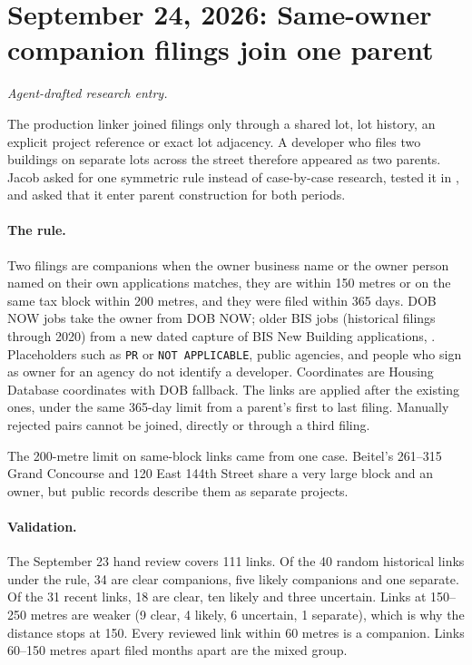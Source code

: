 \clearpage
\section*{September 24, 2026: Same-owner companion filings join one parent}
\textit{Agent-drafted research entry.}

The production linker joined filings only through a shared lot, lot history,
an explicit project reference or exact lot adjacency. A developer who files
two buildings on separate lots across the street therefore appeared as two
parents. Jacob asked for one symmetric rule instead of case-by-case research,
tested it in , and asked that it enter parent
construction for both periods.

\paragraph{The rule.} Two filings are companions when the owner business name
or the owner person named on their own applications matches, they are within
150 metres or on the same tax block within 200 metres, and they were filed
within 365 days. DOB NOW jobs take the owner from DOB NOW; older BIS jobs
(historical filings through 2020) from a new dated capture of BIS New Building
applications, . Placeholders such as
\texttt{PR} or \texttt{NOT APPLICABLE}, public agencies, and people who sign as
owner for an agency do not identify a developer. Coordinates are Housing
Database coordinates with DOB fallback. The links are applied after the
existing ones, under the same 365-day limit from a parent's first to last
filing. Manually rejected pairs cannot be joined, directly or through a third
filing.

The 200-metre limit on same-block links came from one case. Beitel's 261--315
Grand Concourse and 120 East 144th Street share a very large block and an
owner, but public records describe them as separate projects.

\paragraph{Validation.} The September 23 hand review covers 111 links. Of the
40 random historical links under the rule, 34 are clear companions, five
likely companions and one separate. Of the 31 recent links, 18 are clear, ten
likely and three uncertain. Links at 150--250 metres are weaker (9 clear, 4
likely, 6 uncertain, 1 separate), which is why the distance stops at 150.
Every reviewed link within 60 metres is a companion. Links 60--150 metres apart
filed months apart are the mixed group.

